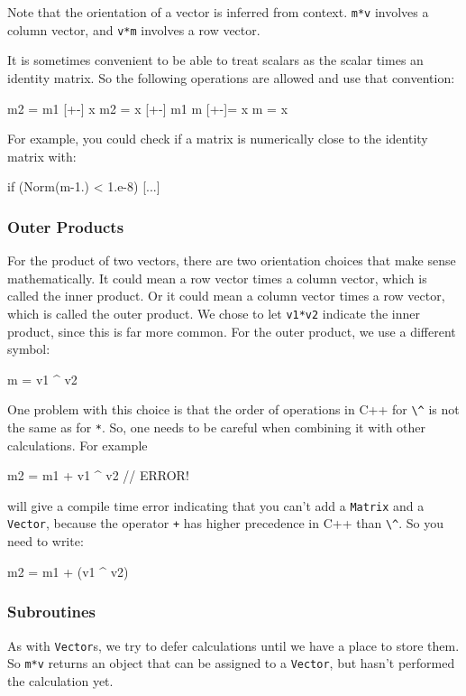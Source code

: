 \documentclass[twoside,letterpaper,11pt]{article}
\renewcommand{\tt}[1]{{\lstinline {#1}}}
\begin{document}
Note that the orientation of a vector is inferred from context.  \tt{m*v} involves a 
column vector, and \tt{v*m} involves a row vector.

It is sometimes convenient to be able to treat scalars as the scalar times an
identity matrix.  So the following operations are allowed and use that convention:
\begin{tmvcode}
m2 = m1 [+-] x
m2 = x [+-] m1
m [+-]= x
m = x
\end{tmvcode}
For example, you could check if a matrix is numerically close to the identity matrix 
with:
\begin{tmvcode}
if (Norm(m-1.) < 1.e-8) { [...] }
\end{tmvcode}

\subsubsection{Outer Products}

For the product of two vectors, there are two orientation choices that make sense mathematically.
It could mean a row vector times a column vector, which is called the inner product.
Or it could mean a column vector times a row vector, which is called the outer product.
We chose to let \tt{v1*v2} indicate the inner product, since this is far more common.
For the outer product, we use a different symbol:
\begin{tmvcode}
m = v1 ^ v2
\end{tmvcode}
One problem with this choice is that the order of operations in C++ for \tt{\^} 
is not the same as for \tt{*}.  
So, one needs to be careful when combining it with other calculations.
For example
\begin{tmvcode}
m2 = m1 + v1 ^ v2   // ERROR!
\end{tmvcode}
will give a compile time error indicating that you can't add a 
\tt{Matrix} and a \tt{Vector}, 
because the operator \tt{+} has higher precedence in C++ than \tt{\^}.
So you need to write:
\begin{tmvcode}
m2 = m1 + (v1 ^ v2)
\end{tmvcode}

\subsubsection{Subroutines}

As with \tt{Vector}s, we try to defer calculations until we have a place to store them.
So \tt{m*v} returns an object that can be assigned to a \tt{Vector},
but hasn't performed the calculation yet.  
\end{document}
